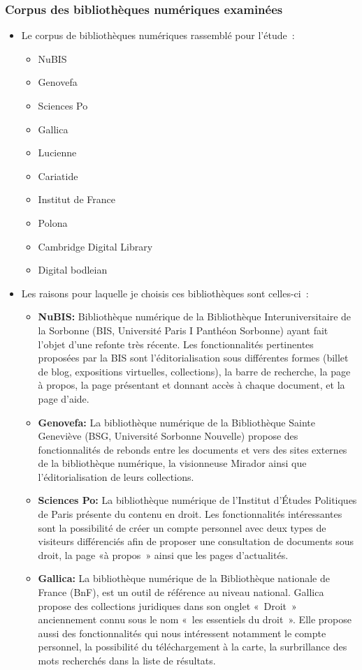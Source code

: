 \subsubsection{Corpus des bibliothèques numériques examinées}
\begin{itemize}
	\item Le corpus de bibliothèques numériques rassemblé pour l’étude :
\begin{itemize}
	\item NuBIS
\item Genovefa
\item Sciences Po
\item Gallica
\item Lucienne
\item Cariatide
\item Institut de France
\item Polona 
\item Cambridge Digital Library
\item Digital bodleian
\end{itemize}
\item Les raisons pour laquelle je choisis ces bibliothèques sont celles-ci : 
\begin{itemize}
	\item \textbf{NuBIS:} Bibliothèque numérique de la Bibliothèque Interuniversitaire de la Sorbonne (BIS, Université Paris I Panthéon Sorbonne) ayant fait l’objet d’une refonte très récente. Les fonctionnalités pertinentes proposées par la BIS sont l'éditorialisation sous différentes formes (billet de blog, expositions virtuelles, collections), la barre de recherche, la page à propos, la page présentant et donnant accès à chaque document, et la page d’aide.
\item \textbf{Genovefa:} La bibliothèque numérique de la Bibliothèque Sainte Geneviève (BSG, Université Sorbonne Nouvelle) propose des fonctionnalités de rebonds entre les documents et vers des sites externes de la bibliothèque numérique, la visionneuse Mirador ainsi que l'éditorialisation de leurs collections.
\item \textbf{Sciences Po:} La bibliothèque numérique de l’Institut d’Études Politiques de Paris présente du contenu en droit. Les fonctionnalités intéressantes sont la possibilité de créer un compte personnel avec deux types de visiteurs différenciés afin de proposer une consultation de documents sous droit, la page «à propos » ainsi que les pages d’actualités. 
\item \textbf{Gallica:} La bibliothèque numérique de la Bibliothèque nationale de France (BnF), est un outil de référence au niveau national. Gallica propose des collections juridiques dans son onglet « Droit » anciennement connu sous le nom « les essentiels du droit ». Elle propose aussi des fonctionnalités qui nous intéressent notamment le compte personnel, la possibilité du téléchargement à la carte, la surbrillance des mots recherchés dans la liste de résultats.

\end{itemize}
\end{itemize}
